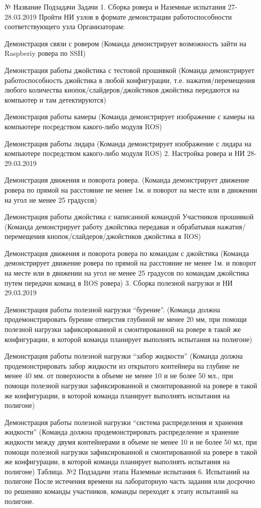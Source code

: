 \begin{table}
\begin{longtable}
№	Название Подзадачи	Задачи
1.	Сборка ровера и Наземные испытания
27-28.03.2019	Пройти НИ узлов в формате демонстрации работоспособности соответствующего узла Организаторам:
    \item Демонстрация связи с ровером (Команда демонстрирует возможность зайти на Raspberiy ровера по SSH)
    \item Демонстрация работы джойстика с тестовой прошивкой (Команда демонстрирует работоспособность джойстика в любой конфигурации, т.е. нажатия/перемещения любого количества кнопок/слайдеров/джойстиков джойстика передаются на компьютер и там детектируются)
    \item Демонстрация работы камеры (Команда демонстрирует изображение с камеры на компьютере посредством какого-либо модуля ROS)
    \item Демонстрация работы лидара (Команда демонстрирует изображение с лидара на компьютере посредством какого-либо модуля ROS)
2.	Настройка ровера и НИ
28-29.03.2019 	    \item Демонстрация движения и поворота ровера. (Команда демонстрирует движение ровера по прямой на расстояние не менее 1м. и поворот на месте или в движении на угол не менее 25 градусов)
    \item Демонстрация работы джойстика с написанной командой Участников прошивкой (Команда демонстрирует работу джойстика передавая и обрабатывая нажатия/перемещения кнопок/слайдеров/джойстиков джойстика в ROS)
    \item Демонстрация движения и поворота ровера по командам с джойстика (Команда демонстрирует движение ровера по прямой на расстояние не менее 1м. и поворот на месте или в движении на угол не менее 25 градусов по командам джойстика путем передачи команд в ROS ровера)
3.	Сборка полезной нагрузки и НИ
29.03.2019 	    \item Демонстрация работы полезной нагрузки “бурение”. (Команда должна продемонстрировать бурение отверстия глубиной не менее 20 мм, при помощи полезной нагрузки зафиксированной и смонтированной на ровере в такой же конфигурации, в которой команда планирует выполнять испытания на полигоне)
    \item Демонстрация работы полезной нагрузки “забор жидкости”
(Команда должна продемонстрировать забор жидкости из открытого контейнера на глубине не менее 40 мм. от поверхности в объеме не менее 10 и не более 50 мл., при помощи полезной нагрузки зафиксированной и смонтированной на ровере в такой же конфигурации, в которой команда планирует выполнять испытания на полигоне)
    \item Демонстрация работы полезной нагрузки “система распределения и хранения жидкости” (Команда должна продемонстрировать распределение и хранение жидкости между двумя контейнерами в объеме не менее 10 и не более 50 мл, при помощи полезной нагрузки зафиксированной и смонтированной на ровере в такой же конфигурации, в которой команда планирует выполнять испытания на полигоне)
 Таблица. №2 Подзадачи этапа Наземные испытания
6. Испытаний на полигоне
После истечения времени на лабораторную часть задания или досрочно по решению команды участников, команды переходят к этапу испытаний на полигоне. 


\end{longtable}
\end{table}
